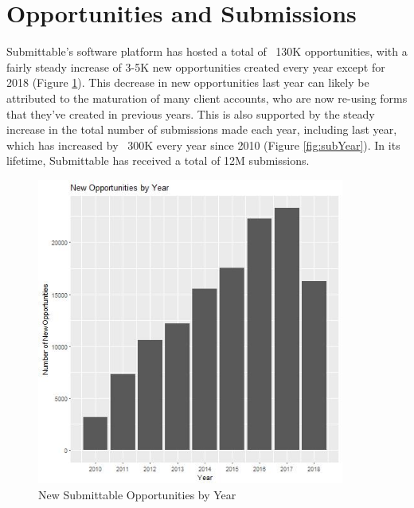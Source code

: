 \documentclass[]{report}   %
\begin{document}
\section{Opportunities and Submissions}
Submittable's software platform has hosted a total of ~130K opportunities, with a fairly steady increase of 3-5K new opportunities created every year except for 2018 (Figure \ref{fig:formYear}). This decrease in new opportunities last year can likely be attributed to the maturation of many client accounts, who are now re-using forms that they've created in previous years. This is also supported by the steady increase in the total number of submissions made each year, including last year, which has increased by ~300K every year since 2010 (Figure \ref{fig:subYear}). In its lifetime, Submittable has received a total of 12M submissions.
\FloatBarrier
\begin{figure}
    \centering
    \begin{minipage}{0.45\textwidth}
        \centering
        \includegraphics[width=0.9\textwidth]{formsByYear_plot.jpg} %
        \caption{New Submittable Opportunities by Year}
	  \label{fig:formYear}
    \end{minipage}\hfill
    \begin{minipage}{0.45\textwidth}
        \centering

\end{minipage}
\end{figure}
\end{document}
